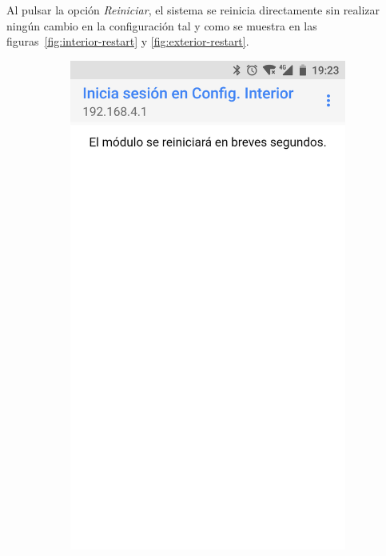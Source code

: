 Al pulsar la opción \emph{Reiniciar}, el sistema se reinicia directamente sin realizar ningún cambio en la configuración tal y como se muestra en las figuras~\ref{fig:interior-restart} y \ref{fig:exterior-restart}.

\vfill

\begin{figure}[b!]
\begin{subfigure}{0.49\columnwidth}
  \centering
  \includegraphics[width=1\columnwidth,frame]{images/interior-restart}

\end{subfigure}
\end{figure}
